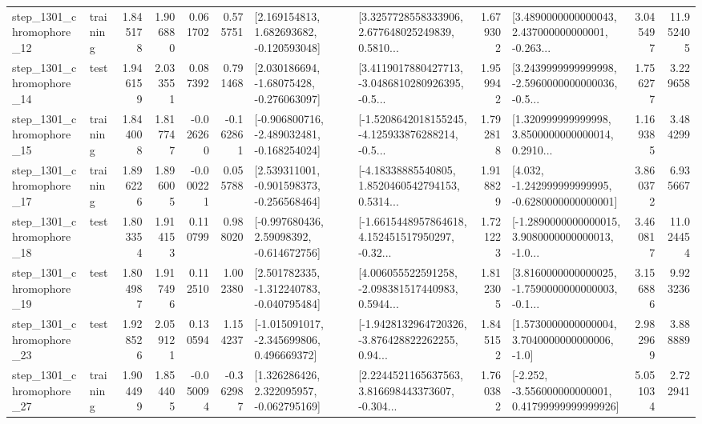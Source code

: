 \begin{tabular}{llrrrrllrlrr}
 step\_1301\_chromophore\_12 &  training &      1.845178 &    1.906880 &      0.061702 &  0.575751 &    [2.169154813, 1.682693682, -0.120593048] &  [3.3257728558333906, 2.677648025249839, 0.5810... &       1.679302 &  [3.4890000000000043, 2.437000000000001, -0.263... &            3.045497 &         11.952405 \\
 step\_1301\_chromophore\_14 &      test &      1.946159 &    2.033551 &      0.087392 &  0.791468 &    [2.030186694, -1.68075428, -0.276063097] &  [3.4119017880427713, -3.0486810280926395, -0.5... &       1.959942 &  [3.2439999999999998, -2.5960000000000036, -0.5... &            1.756277 &          3.229658 \\
 step\_1301\_chromophore\_15 &  training &      1.844008 &    1.817747 &     -0.026260 & -0.162861 &  [-0.906800716, -2.489032481, -0.168254024] &  [-1.5208642018155245, -4.125933876288214, -0.5... &       1.792818 &  [1.320999999999998, 3.8500000000000014, 0.2910... &            1.169385 &          3.484299 \\
 step\_1301\_chromophore\_17 &  training &      1.896226 &    1.896005 &     -0.000221 &  0.055788 &   [2.539311001, -0.901598373, -0.256568464] &  [-4.18338885540805, 1.8520460542794153, 0.5314... &       1.918829 &   [4.032, -1.242999999999995, -0.6280000000000001] &            3.860372 &          6.935667 \\
 step\_1301\_chromophore\_18 &      test &      1.803354 &    1.914153 &      0.110799 &  0.988020 &    [-0.997680436, 2.59098392, -0.614672756] &  [-1.6615448957864618, 4.152451517950297, -0.32... &       1.721223 &  [-1.2890000000000015, 3.9080000000000013, -1.0... &            3.460817 &         11.024454 \\
 step\_1301\_chromophore\_19 &      test &      1.804987 &    1.917496 &      0.112510 &  1.002380 &   [2.501782335, -1.312240783, -0.040795484] &  [4.006055522591258, -2.098381517440983, 0.5944... &       1.812305 &  [3.8160000000000025, -1.7590000000000003, -0.1... &            3.156886 &          9.923236 \\
 step\_1301\_chromophore\_23 &      test &      1.928526 &    2.059121 &      0.130594 &  1.154237 &   [-1.015091017, -2.345699806, 0.496669372] &  [-1.9428132964720326, -3.876428822262255, 0.94... &       1.845152 &     [1.5730000000000004, 3.7040000000000006, -1.0] &            2.982969 &          3.888889 \\
 step\_1301\_chromophore\_27 &  training &      1.904499 &    1.854405 &     -0.050094 & -0.362987 &    [1.326286426, 2.322095957, -0.062795169] &  [2.2244521165637563, 3.816698443373607, -0.304... &       1.760382 &  [-2.252, -3.556000000000001, 0.41799999999999926] &            5.051034 &          2.722941 \\

\end{tabular}
